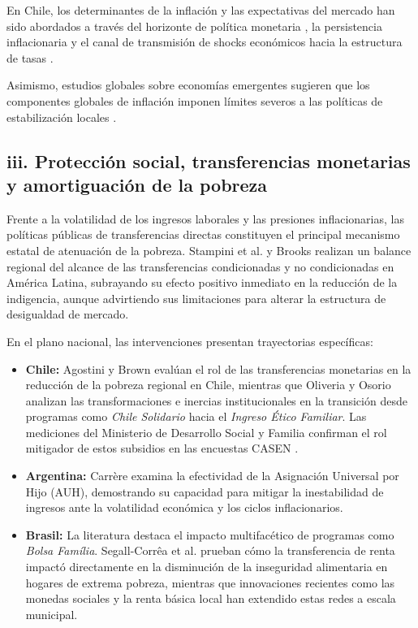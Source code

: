 En Chile, los determinantes de la inflación y las expectativas del mercado han sido abordados a través del horizonte de política monetaria \parencite{Gredigetal2008}, la persistencia inflacionaria \parencite{Pincheira2008, Medel2025} y el canal de transmisión de shocks económicos hacia la estructura de tasas \parencite{CabellosSanhueza2016, Al-HelalUddinAkram2025}. 

Asimismo, estudios globales sobre economías emergentes sugieren que los componentes globales de inflación imponen límites severos a las políticas de estabilización locales \parencite{Geoetal2024, CakirEkrem2025, Yilmazkuday2025}.

\subsection{iii. Protección social, transferencias monetarias y amortiguación de la pobreza}

Frente a la volatilidad de los ingresos laborales y las presiones inflacionarias, las políticas públicas de transferencias directas constituyen el principal mecanismo estatal de atenuación de la pobreza. Stampini et al. \parencite*{Stampinietal2025} y Brooks \parencite*{Brooks2015} realizan un balance regional del alcance de las transferencias condicionadas y no condicionadas en América Latina, subrayando su efecto positivo inmediato en la reducción de la indigencia, aunque advirtiendo sus limitaciones para alterar la estructura de desigualdad de mercado.

En el plano nacional, las intervenciones presentan trayectorias específicas:
\begin{itemize}
\item \textbf{Chile:} Agostini y Brown \parencite*{AgostiniBrown2011} evalúan el rol de las transferencias monetarias en la reducción de la pobreza regional en Chile, mientras que Oliveria y Osorio \parencite*{OliveiraOsorioGonner2022} analizan las transformaciones e inercias institucionales en la transición desde programas como \textit{Chile Solidario} hacia el \textit{Ingreso Ético Familiar}. Las mediciones del Ministerio de Desarrollo Social y Familia confirman el rol mitigador de estos subsidios en las encuestas CASEN \parencite{ResumenResultadosCASEN2023,TensoresBienestarSocial2024}.
\item \textbf{Argentina:} Carrère \parencite*{Carrere2026} examina la efectividad de la Asignación Universal por Hijo (AUH), demostrando su capacidad para mitigar la inestabilidad de ingresos ante la volatilidad económica y los ciclos inflacionarios.
\item \textbf{Brasil:} La literatura destaca el impacto multifacético de programas como \textit{Bolsa Família}. Segall-Corrêa et al. \parencite*{Segall-Correaetal2008} prueban cómo la transferencia de renta impactó directamente en la disminución de la inseguridad alimentaria en hogares de extrema pobreza, mientras que innovaciones recientes como las monedas sociales y la renta básica local \parencite{OrnellasMauriel2025} han extendido estas redes a escala municipal.
\end{itemize}

